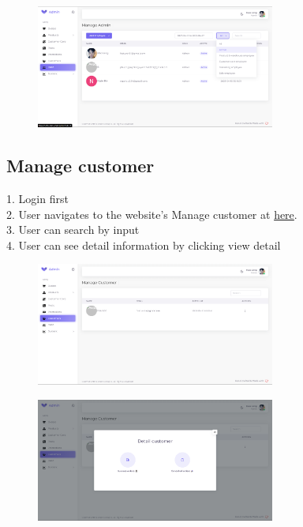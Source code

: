\begin{figure}[H]
    \centering
    \includegraphics[width=0.7\textwidth]{Demo/Screenshot_6.png}
    \label{fig:supportpage}
\end{figure}
\subsection{Manage customer}
1. Login first \\
2. User navigates to the website's Manage customer at \href{https://coffee.skrt.cc/admin/customer}{here}. \\
3. User can search by input\\
4. User can see detail information by clicking view detail\\
\begin{figure}[H]
    \centering
    \includegraphics[width=0.7\textwidth]{Demo/Screenshot_8.png}
    \label{fig:supportpage}
\end{figure}
\begin{figure}[H]
    \centering
    \includegraphics[width=0.7\textwidth]{Demo/Screenshot_9.png}
    \label{fig:supportpage}
\end{figure}

